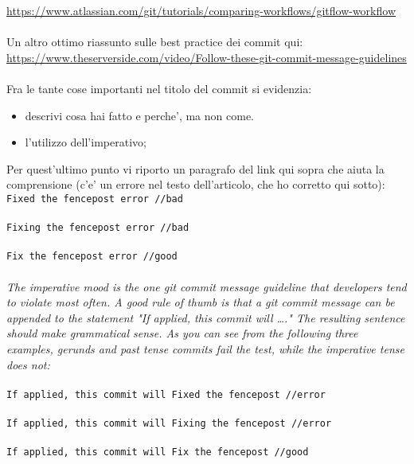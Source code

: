 \url{https://www.atlassian.com/git/tutorials/comparing-workflows/gitflow-workflow}\\
\\
Un altro ottimo riassunto sulle best practice dei commit qui: \\
\url{https://www.theserverside.com/video/Follow-these-git-commit-message-guidelines}\\
\\
Fra le tante cose importanti nel titolo del commit si evidenzia:
\begin{itemize}
\item descrivi cosa hai fatto e perche', ma non come.
\item l'utilizzo dell'imperativo;
\end{itemize}
Per quest'ultimo punto vi riporto un paragrafo del link qui sopra che aiuta la comprensione (c'e' un errore nel testo dell'articolo, che ho corretto qui sotto):
\\
\texttt{Fixed the fencepost error //bad \\
\\
Fixing the fencepost error //bad \\
\\
Fix the fencepost error //good} \\
\\
\textit{The imperative mood is the one git commit message guideline that developers tend to violate most often. A good rule of thumb is that a git commit message can be appended to the statement "If applied, this commit will …." The resulting sentence should make grammatical sense. As you can see from the following three examples, gerunds and past tense commits fail the test, while the imperative tense does not:}\\
\\
\texttt{If applied, this commit will Fixed the fencepost //error\\
\\
If applied,  this commit will Fixing the fencepost //error\\
\\
If applied,  this commit will Fix the fencepost //good}\\
